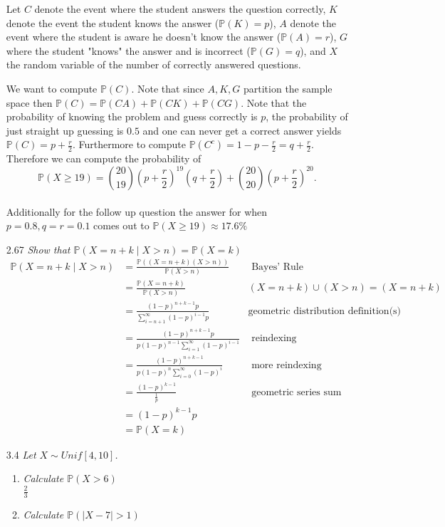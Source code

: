 \documentclass[12pt, letterpaper]{article}
\newcommand{\Pro}{\mathbb{P}}
\begin{document}
\begin{enumerate}
Let $C$ denote the event where the student answers the question correctly, $K$ denote the event the student knows the answer ($\Pro(K) = p$), $A$ denote the event where the student is aware he doesn't know the answer ($\Pro(A) = r$), $G$ where the student "knows" the answer and is incorrect ($\Pro(G) = q$), and $X$ the random variable of the number of correctly answered questions.

	We want to compute $\Pro(C)$.  Note that since $A,K,G$ partition the sample space then $\Pro(C) = \Pro(CA) + \Pro(CK) + \Pro(CG)$.  Note that the probability of knowing the problem and guess correctly is $p$, the probability of just straight up guessing is $0.5$ and one can never get a correct answer yields $\Pro(C) = p + \frac{r}{2}$.  Furthermore to compute
	$\Pro(C^c) = 1 - p - \frac{r}{2} = q + \frac{r}{2}$.  Therefore we 
	can compute the probability of 
	$$\Pro(X\geq 19) = \binom{20}{19}(p + \frac{r}{2})^{19}(q + \frac{r}{2}) + \binom{20}{20}(p + \frac{r}{2})^{20}.$$\\
	Additionally for the follow up question the answer for when $p=0.8, q=r=0.1$ comes out to $\Pro(X\geq 19) \approx 17.6\%$
	\item[2.67]\textit{Show that $\Pro(X=n+k\mid X>n) = \Pro(X=k)$}\\
	\begin{align*}
		\Pro(X=n+k\mid X>n) &= \frac{\Pro((X=n+k)(X>n))}{\Pro(X>n)} & \text { Bayes' Rule}\\
		&= \frac{\Pro(X=n+k)}{\Pro(X>n)} & (X=n+k)\cup (X>n) = (X=n+k) \\
		&= \frac{(1-p)^{n+k-1}p}{\sum_{i=n+1}^\infty (1-p)^{i-1}p} & \text{geometric distribution definition(s)}\\
		&= \frac{(1-p)^{n+k-1}p}{p(1-p)^{n-1}\sum_{i=1}^\infty (1-p)^{i-1}}& \text{ reindexing}\\
		&= \frac{(1-p)^{n+k-1}}{p(1-p)^{n}\sum_{i=0}^\infty (1-p)^{i}}& \text{ more reindexing}\\
		&= \frac{(1-p)^{k-1}}{\frac{1}{p}} & \text{ geometric series sum}\\
		&= (1-p)^{k-1}p\\
		&= \Pro(X=k)
	\end{align*}
	\item[3.4]\textit{Let $X \sim Unif[4, 10]$.}
	\begin{enumerate}
		\item \textit{Calculate $\Pro(X>6)$}\\
		$\frac{2}{3}$
		\item \textit{Calculate $\Pro(|X - 7| > 1)$}\\

\end{enumerate}
\end{enumerate}
\end{document}
